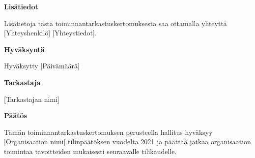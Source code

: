 \documentclass{article}
\begin{document}
\textbf{Lisätiedot}

Lisätietoja tästä toiminnantarkastuskertomuksesta saa ottamalla yhteyttä [Yhteyshenkilö] [Yhteystiedot].

\bigskip

\textbf{Hyväksyntä}

Hyväksytty [Päivämäärä]

\bigskip

\textbf{Tarkastaja}

[Tarkastajan nimi]
\bigskip

\textbf{Päätös}

Tämän toiminnantarkastuskertomuksen perusteella hallitus hyväksyy [Organisaation nimi] tilinpäätöksen vuodelta 2021 ja päättää jatkaa organisaation toimintaa tavoitteiden mukaisesti seuraavalle tilikaudelle.
\end{document}
